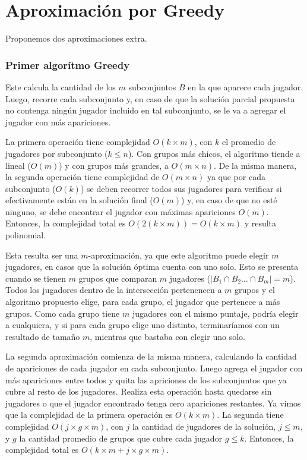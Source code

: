 \section{Aproximación por Greedy}

Proponemos dos aproximaciones extra.

\subsubsection{Primer algorítmo Greedy}

Este calcula la cantidad de los $m$ subconjuntos $B$ en la que aparece cada jugador. Luego, recorre cada subconjunto y, en caso de que la solución parcial propuesta no contenga ningún jugador incluido en tal subconjunto, se le va a agregar el jugador con más apariciones. 

La primera operación tiene complejidad $O(k \times m)$, con $k$ el promedio de jugadores por subconjunto ($k \leq n$). Con grupos más chicos, el algoritmo tiende a lineal ($O(m)$) y con grupos más grandes, a $O(m\times n)$. 
De la misma manera, la segunda operación tiene complejidad de  $O(m\times n)$ ya que por cada subconjunto ($O(k)$) se deben recorrer todos sus jugadores para verificar si efectivamente están en la solución final ($O(m)$) y, en caso de que no esté ninguno, se debe encontrar el jugador con máximas apariciones $O(m)$. Entonces, la complejidad total es $O(2(k \times m))=O(k \times m)$ y resulta polinomial.

Esta resulta ser una $m$-aproximación, ya que este algoritmo puede elegir $m$ jugadores, en casos que la solución óptima cuenta con uno solo. Esto se presenta cuando se tienen $m$ grupos que comparan $m$ jugadores ($\left|B_1 \cap B_2 \dots \cap B_m\right| = m$). Todos los jugadores dentro de la intersección pertenencen a $m$ grupos y el algoritmo propuesto elige, para cada grupo, el jugador que pertenece a más grupos. Como cada grupo tiene $m$ jugadores con el mismo puntaje, podría elegir a cualquiera, y si para cada grupo elige uno distinto, terminaríamos con un resultado de tamaño $m$, mientras que bastaba con elegir uno solo.

La segunda aproximación comienza de la misma manera, calculando la cantidad de apariciones de cada jugador en cada subconjunto. Luego agrega el jugador con más apariciones entre todos y quita las apriciones de los subconjuntos que ya cubre al resto de los jugadores. Realiza esta operación hasta quedarse sin jugadores o que el jugador encontrado tenga cero apariciones restantes. Ya vimos que la complejidad de la primera operación es $O(k \times m)$. La segunda tiene complejidad $O(j \times g \times m)$, con $j$ la cantidad de jugadores de la solución, $j \leq m$, y $g$ la cantidad promedio de grupos que cubre cada jugador $g \leq k$. Entonces, la complejidad total es $O(k \times m + j \times g \times m)$. %

    